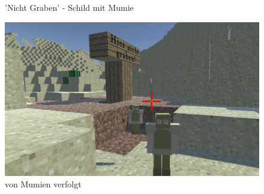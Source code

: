 \documentclass{article}
\begin{document}
\begin{center}
\begin{figure}
\caption{'Nicht Graben' - Schild mit Mumie}
\end{figure}
\begin{figure}
\includegraphics[width=\textwidth]{sign_2.png}
\caption{von Mumien verfolgt}
\end{figure}
\end{center}
\end{document}
